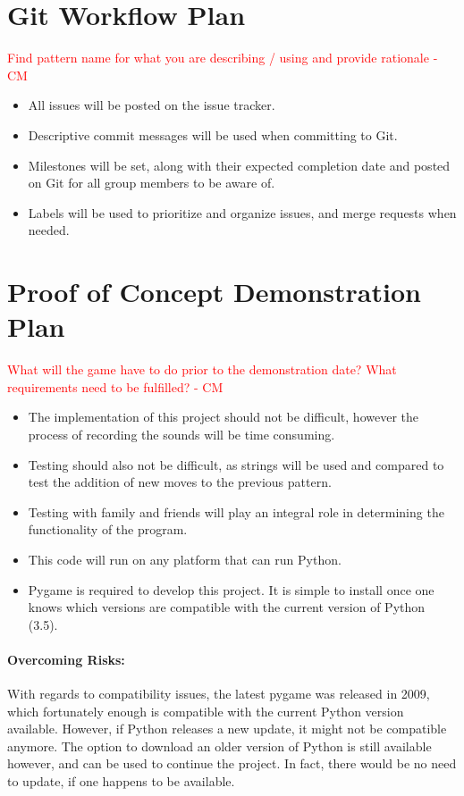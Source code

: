 \documentclass{article}
\begin{document}
\section{Git Workflow Plan}
\textcolor{red}{Find pattern name for what you are describing / using and provide rationale - CM} \\
\begin{itemize}
\item All issues will be posted on the issue tracker.
\item Descriptive commit messages will be used when committing to Git. 
\item Milestones will be set, along with their expected completion date and posted on Git for all group members to be aware of.
\item Labels will be used to prioritize and organize issues, and merge requests when needed.
\end{itemize}
\section{Proof of Concept Demonstration Plan}
\textcolor{red}{What will the game have to do prior to the demonstration date? What requirements need to be fulfilled?  - CM} \\
\begin{itemize}
\item The implementation of this project should not be difficult, however the process of recording the sounds will be time consuming.
\item Testing should also not be difficult, as strings will be used and compared to test the addition of new moves to the previous pattern.
\item Testing with family and friends will play an integral role in determining the functionality of the program.
\item This code will run on any platform that can run Python.
\item Pygame is required to develop this project. It is simple to install once one knows which versions are compatible with the current version of Python (3.5).
\end{itemize}
\paragraph{Overcoming Risks:}
With regards to compatibility issues, the latest pygame was released in 2009, which fortunately enough is compatible with the current Python version available. However, if Python releases a new update, it might not be compatible anymore. The option to download an older version of Python is still available however, and can be used to continue the project. In fact, there would be no need to update, if one happens to be available.
\end{document}
